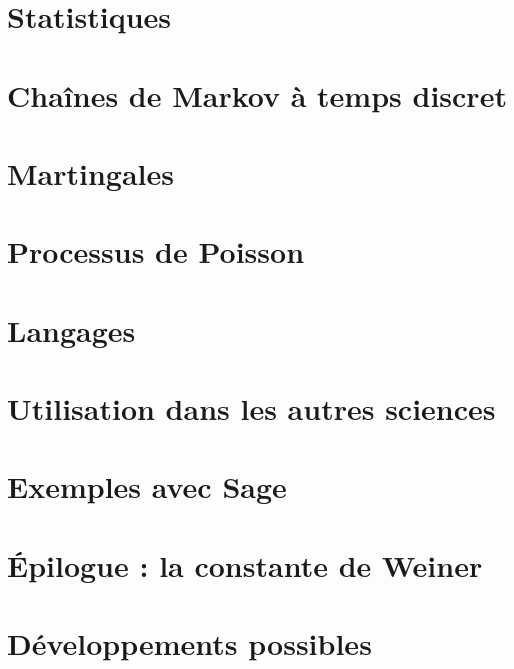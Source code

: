 \documentclass[a4paper,twoside,11pt]{book}
\begin{document}
\chapter{Statistiques}


\chapter{Chaînes de Markov à temps discret}


\chapter{Martingales}


\chapter{Processus de Poisson}


\chapter{Langages}


\chapter{Utilisation dans les autres sciences}


\chapter{Exemples avec Sage}



\chapter{Épilogue : la constante de Weiner}



\chapter{Développements possibles}



\emptyInputPath
{}
\end{document}
